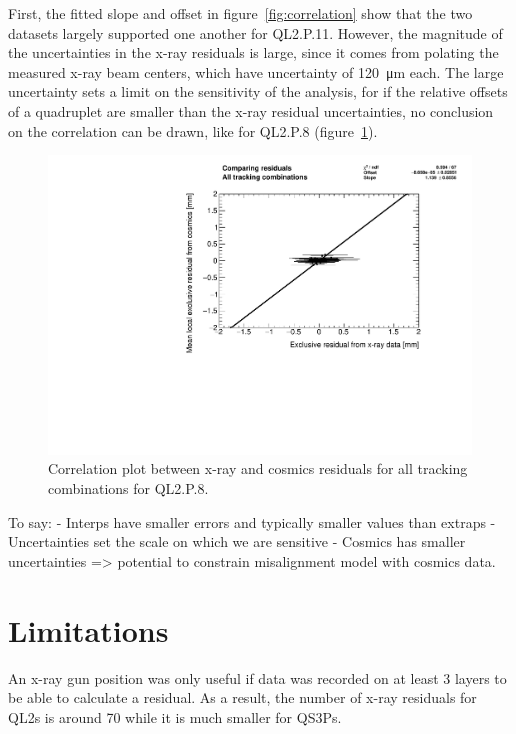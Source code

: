 First, the fitted slope and offset in figure~\ref{fig:correlation} show that the two datasets largely supported one another for QL2.P.11. However, the magnitude of the uncertainties in the x-ray residuals is large, since it comes from polating the measured x-ray beam centers, which have uncertainty of \SI{120}{\micro\meter} each. The large uncertainty sets a limit on the sensitivity of the analysis, for if the relative offsets of a quadruplet are smaller than the x-ray residual uncertainties, no conclusion on the correlation can be drawn, like for QL2.P.8 (figure~\ref{fig:no_correlation}).

\begin{figure}
    \centering
    \includegraphics[width = \textwidth]{figures/QL2P08_3100V_2021-07-26_200um_residual_bins_local_mean_cosmics_residual_vs_xray_residual_scatter_all.pdf}
    \caption{Correlation plot between x-ray and cosmics residuals for all tracking combinations for QL2.P.8.}
    \label{fig:no_correlation}
\end{figure}

To say:
- Interps have smaller errors and typically smaller values than extraps
- Uncertainties set the scale on which we are sensitive
- Cosmics has smaller uncertainties => potential to constrain misalignment model with cosmics data.



\section{Limitations}
An x-ray gun position was only useful if data was recorded on at least 3 layers to be able to calculate a residual. As a result, the number of x-ray residuals for QL2s is around 70 while it is much smaller for QS3Ps.

